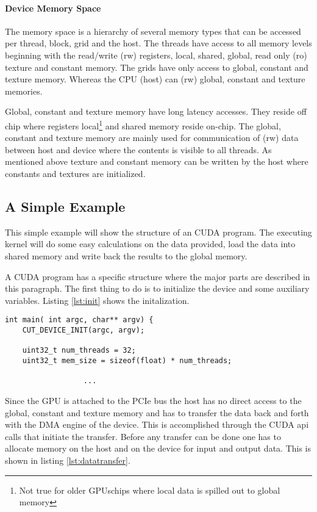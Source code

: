 \paragraph{Device Memory Space} %
\label{par:device_memory_space}
The memory space is a hierarchy of several memory types that can be accessed per
thread, block, grid and the host. The threads have access to all memory levels
beginning with the read/write (rw) registers, local, shared, global, read only
(ro) texture and constant memory. The grids have only access to global, constant
and texture memory. Whereas the CPU (host) can (rw) global, constant and texture
memories.

Global, constant and texture memory have long latency accesses. They reside off
chip where registers local\footnote{Not true for older \glspl{GPU}chips where local
data is spilled out to global memory} and shared memory reside on-chip. The
global, constant and texture memory are mainly used for communication of (rw)
data between host and device where the contents is visible to all threads. As
mentioned above texture and constant memory can be written by the host where
constants and textures are initialized.


\subsection*{A Simple Example} %
\label{sub:a_simple_example}
This simple example will show the structure of an \gls{CUDA} program. The executing
kernel will do some easy calculations on the data provided, load the data into
shared memory  and write back the results to the global memory. 

A \gls{CUDA} program has a specific structure where the major parts are described in
this paragraph. The first thing to do is to initialize the device and some
auxiliary variables. Listing \autoref{lst:init} shows the initalization.

%
\begin{lstlisting}[caption=Hardware initalization, label=lst:init]
int main( int argc, char** argv) {
	CUT_DEVICE_INIT(argc, argv);

	uint32_t num_threads = 32;
	uint32_t mem_size = sizeof(float) * num_threads;
	    							
                  ...
\end{lstlisting}
%

Since the \gls{GPU} is attached to the PCIe bus the host has no direct access to 
the global, constant and texture memory and has to transfer the data back
and forth with the DMA engine of the device. This is accomplished through the 
CUDA api calls that initiate the transfer. Before any transfer can be done
one has to allocate memory on the host and on the device for input and output
data. This is shown in listing \autoref{lst:datatransfer}.



